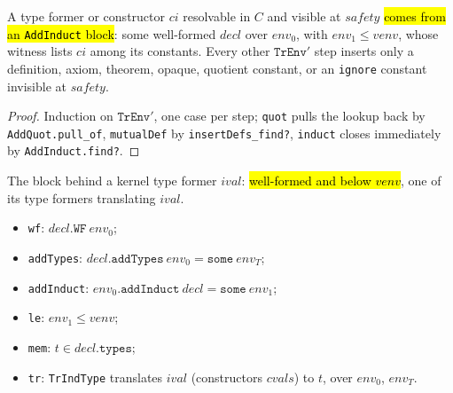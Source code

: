 \begin{theorem}
\label{thm:tr-env-find-induct}
\leanok
{}

 A type former or constructor $ci$ resolvable in $C$ and visible at
$safety$ \hl{comes from an \texttt{AddInduct} block}: some well-formed $decl$ over
$env_0$, with $env_1 \le venv$, whose witness lists $ci$ among its constants. Every
other $\mathtt{TrEnv}'$ step inserts only a definition, axiom, theorem, opaque,
quotient constant, or an \texttt{ignore} constant invisible at $safety$.
\end{theorem}
\begin{proof}
\leanok
{} Induction on $\mathtt{TrEnv}'$, one case per step; \texttt{quot} pulls the
lookup back by \texttt{AddQuot.pull\_of}, \texttt{mutualDef} by
\texttt{insertDefs\_find?}, \texttt{induct} closes immediately by
\texttt{AddInduct.find?}.
\end{proof}

\begin{definition}
\label{struct:induct-origin}
\leanok
{}

 The block behind a kernel type former $ival$: \hl{well-formed and below
$venv$}, one of its type formers translating $ival$.
\begin{itemize}
\item \texttt{wf}: $decl.\mathtt{WF}\ env_0$;
\item \texttt{addTypes}: $decl.\mathtt{addTypes}\ env_0 = \mathtt{some}\ env_T$;
\item \texttt{addInduct}: $env_0.\mathtt{addInduct}\ decl = \mathtt{some}\ env_1$;
\item \texttt{le}: $env_1 \le venv$;
\item \texttt{mem}: $t \in decl.\mathtt{types}$;
\item \texttt{tr}: \texttt{TrIndType} translates $ival$ (constructors $cvals$) to $t$,
over $env_0$, $env_T$.
\end{itemize}
\end{definition}

